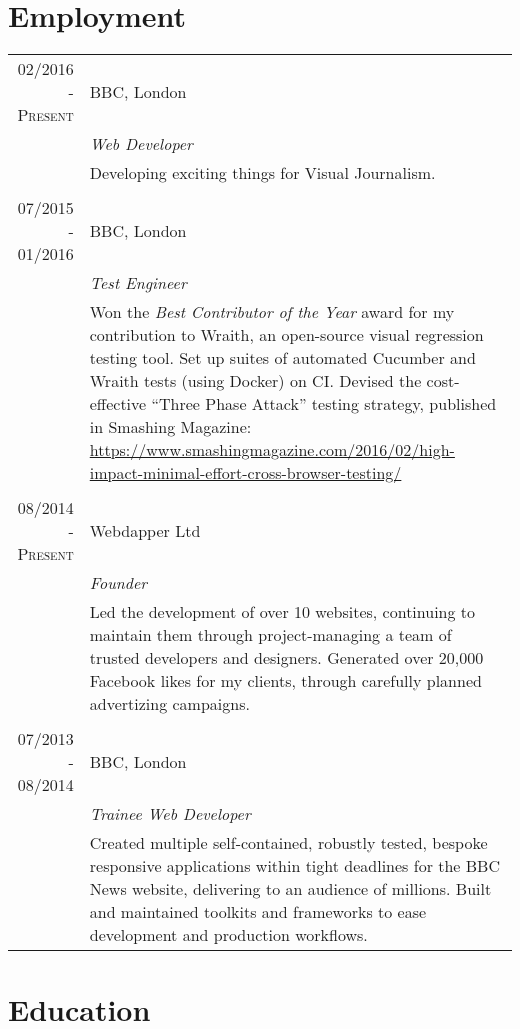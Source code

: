 \documentclass[class=article, crop=false]{standalone}
\begin{document}
\section{Employment}
\begin{tabular}{r|p{11cm}}
\textsc{02/2016 - Present} & BBC, London
\\&\emph{Web Developer}
\\&\footnotesize{
Developing exciting things for Visual Journalism.
}
\\\multicolumn{2}{c}{} \\
\textsc{07/2015 - 01/2016} & BBC, London
\\&\emph{Test Engineer}
\\&\footnotesize{
Won the \emph{Best Contributor of the Year} award for my contribution to Wraith, an open-source visual regression testing tool. Set up suites of automated Cucumber and Wraith tests (using Docker) on CI. Devised the cost-effective ``Three Phase Attack'' testing strategy, published in Smashing Magazine:
\url{https://www.smashingmagazine.com/2016/02/high-impact-minimal-effort-cross-browser-testing/}
}
\\\multicolumn{2}{c}{} \\
\textsc{08/2014 - Present} & Webdapper Ltd
\\&\emph{Founder}
\\&\footnotesize{Led the development of over 10 websites, continuing to maintain them through project-managing a team of trusted developers and designers. Generated over 20,000 Facebook likes for my clients, through carefully planned advertizing campaigns.}
\\\multicolumn{2}{c}{} \\
\textsc{07/2013 - 08/2014} & BBC, London
\\&\emph{Trainee Web Developer}
\\&\footnotesize{Created multiple self-contained, robustly tested, bespoke responsive applications within tight deadlines for the BBC News website, delivering to an audience of millions. Built and maintained toolkits and frameworks to ease development and production workflows.}
\end{tabular}

\section{Education}
\end{document}
